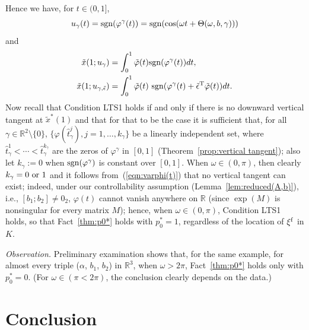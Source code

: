\documentclass[letterpaper,10pt,conference]{ieeeconf}
\def\R{{\mathbb{R}}}
\begin{document}
Hence we have, for $t\in(0,1]$,
\begin{equation}
\label{eqn:ugamma=sgn}
u_\gamma(t) = {\rm sgn}(\varphi^\gamma(t))
= {\rm sgn}(\cos(\omega t+\Theta(\omega,b,\gamma)))
\end{equation}
and
\[
\begin{aligned}
\tilde x(1;u_\gamma)&=\int_0^1 \tilde\varphi(t)
{\rm sgn}(\varphi^\gamma(t))dt,\\
\tilde x(1;u_{\gamma,\tilde\epsilon}) &= \int_0^1 \tilde\varphi(t)
~{\rm sgn}(\varphi^\gamma(t)+\tilde\epsilon^{\rm T}\tilde\varphi(t))dt.
\end{aligned}
\]
Now recall that Condition LTS1 holds if and only if there is no
downward vertical tangent at $\tilde x^*(1)$ and that for that to
be the case it is sufficient that, for all $\gamma\in\R^2\setminus\{0\}$,
$\{\varphi(\hat t^j_\gamma), j=1,\ldots,k_\gamma\}$ be a linearly 
independent set, where
$\hat t_\gamma^1<\cdots<\hat t_\gamma^{k_\gamma}$ are the
zeros of $\varphi^\gamma$ in $[0,1]$
(Theorem~\ref{prop:vertical tangent});
also let
$k_\gamma:=0$ when ${\rm sgn}(\varphi^\gamma)$
is constant over $[0,1]$.
When $\omega\in(0,\pi)$, then clearly $k_\gamma=0 {\rm~or~}1$ and it follows
from~(\ref{eqn:varphi(t)}) that no vertical tangent can exist; indeed, 
under our controllability assumption (Lemma~\ref{lem:reduced(A,b)}), i.e.,
$[b_1;b_2]\not=0_2$, $\varphi(t)$ 
cannot vanish anywhere on $\R$ (since $\exp(M)$ is nonsingular for every
matrix $M$); hence, when $\omega\in(0,\pi)$,
Condition LTS1 holds, so that Fact~\ref{thm:p0*} holds 
with $p_0^*=1$, regardless of the location of $\xi^{\rm f}$ in $K$.

{\em Observation.} Preliminary examination shows that, 
for the same example, for almost every triple ($\alpha$, $b_1$, $b_2$)
in $\R^3$, when $\omega>2\pi$, Fact~\ref{thm:p0*} holds only with $p_0^*=0$.  
(For $\omega\in(\pi<2\pi)$, the conclusion clearly depends on the data.)

\section{Conclusion}
\end{document}
